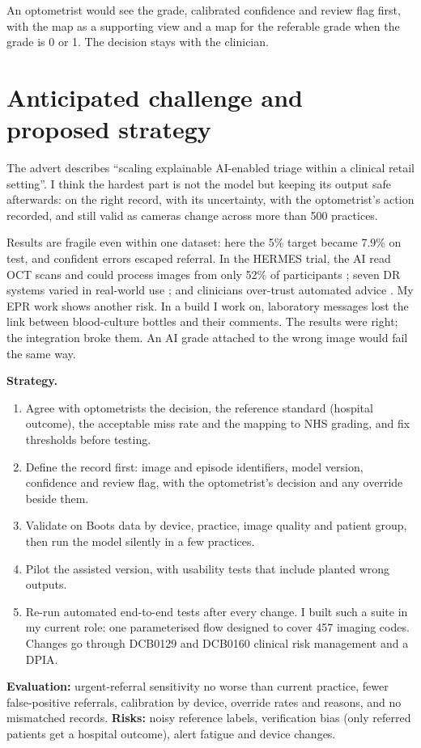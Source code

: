 \documentclass[11pt,a4paper]{article}
\begin{document}
An optometrist would see the grade, calibrated confidence and review flag first, with the map as a supporting view and a map for the referable grade when the grade is 0 or 1. The decision stays with the clinician.

\section{Anticipated challenge and proposed strategy}

The advert describes ``scaling explainable AI-enabled triage within a clinical retail setting''. I think the hardest part is not the model but keeping its output safe afterwards: on the right record, with its uncertainty, with the optometrist's action recorded, and still valid as cameras change across more than 500 practices.

Results are fragile even within one dataset: here the 5\% target became 7.9\% on test, and confident errors escaped referral. In the HERMES trial, the AI read OCT scans and could process images from only 52\% of participants \cite{sharma2025}; seven DR systems varied in real-world use \cite{lee2021}; and clinicians over-trust automated advice \cite{goddard2012}. My EPR work shows another risk. In a build I work on, laboratory messages lost the link between blood-culture bottles and their comments. The results were right; the integration broke them. An AI grade attached to the wrong image would fail the same way.

\textbf{Strategy.}
\begin{enumerate}
  \item Agree with optometrists the decision, the reference standard (hospital outcome), the acceptable miss rate and the mapping to NHS grading, and fix thresholds before testing.
  \item Define the record first: image and episode identifiers, model version, confidence and review flag, with the optometrist's decision and any override beside them.
  \item Validate on Boots data by device, practice, image quality and patient group, then run the model silently in a few practices.
  \item Pilot the assisted version, with usability tests that include planted wrong outputs.
  \item Re-run automated end-to-end tests after every change. I built such a suite in my current role: one parameterised flow designed to cover 457 imaging codes. Changes go through DCB0129 and DCB0160 clinical risk management \cite{dcb0129,dcb0160} and a DPIA.
\end{enumerate}
\textbf{Evaluation:} urgent-referral sensitivity no worse than current practice, fewer false-positive referrals, calibration by device, override rates and reasons, and no mismatched records. \textbf{Risks:} noisy reference labels, verification bias (only referred patients get a hospital outcome), alert fatigue and device changes.
\end{document}
